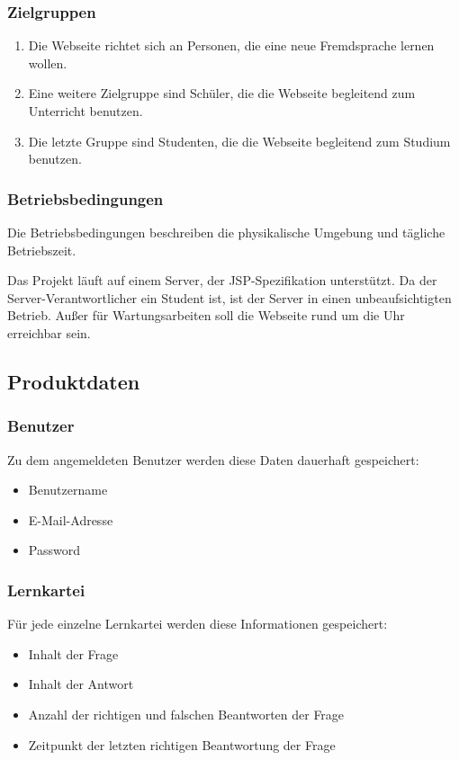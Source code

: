 \subsubsection{Zielgruppen}
\begin{enumerate}[leftmargin=2cm, label=\bfseries /ZG\arabic*0/]
	\item Die Webseite richtet sich an Personen, die eine neue Fremdsprache lernen wollen.
	\item Eine weitere Zielgruppe sind Schüler, die die Webseite begleitend zum Unterricht benutzen.
	\item Die letzte Gruppe sind Studenten, die die Webseite begleitend zum Studium benutzen.
\end{enumerate}


\subsubsection{Betriebsbedingungen}
Die Betriebsbedingungen beschreiben die physikalische Umgebung und tägliche Betriebszeit.

Das Projekt läuft auf einem Server, der JSP-Spezifikation unterstützt. Da der Server-Verantwortlicher ein Student ist, ist der Server in einen unbeaufsichtigten Betrieb. Außer für Wartungsarbeiten soll die Webseite rund um die Uhr erreichbar sein.


\subsection{Produktdaten}
\subsubsection{Benutzer}
Zu dem angemeldeten Benutzer werden diese Daten dauerhaft gespeichert:
\begin{itemize}
	\item Benutzername
	\item E-Mail-Adresse
	\item Password
\end{itemize}

\subsubsection{Lernkartei}
Für jede einzelne Lernkartei werden diese Informationen gespeichert:
\begin{itemize}
	\item Inhalt der Frage
	\item Inhalt der Antwort
	\item Anzahl der richtigen und falschen Beantworten der Frage
	\item Zeitpunkt der letzten richtigen Beantwortung der Frage
\end{itemize}


